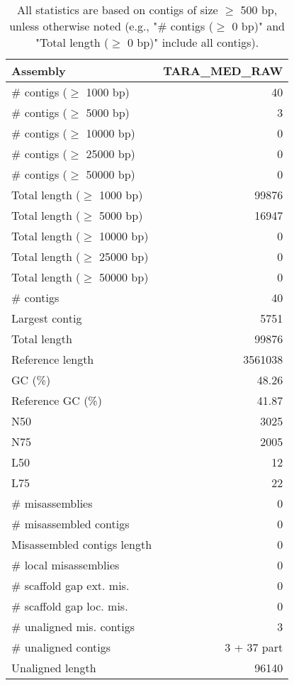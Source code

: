 \documentclass[12pt,a4paper]{article}
\begin{document}
\begin{table}[ht]
\begin{center}
\caption{All statistics are based on contigs of size $\geq$ 500 bp, unless otherwise noted (e.g., "\# contigs ($\geq$ 0 bp)" and "Total length ($\geq$ 0 bp)" include all contigs).}
\begin{tabular}{|l*{1}{|r}|}
\hline
Assembly & TARA\_MED\_RAW \\ \hline
\# contigs ($\geq$ 1000 bp) & 40 \\ \hline
\# contigs ($\geq$ 5000 bp) & 3 \\ \hline
\# contigs ($\geq$ 10000 bp) & 0 \\ \hline
\# contigs ($\geq$ 25000 bp) & 0 \\ \hline
\# contigs ($\geq$ 50000 bp) & 0 \\ \hline
Total length ($\geq$ 1000 bp) & 99876 \\ \hline
Total length ($\geq$ 5000 bp) & 16947 \\ \hline
Total length ($\geq$ 10000 bp) & 0 \\ \hline
Total length ($\geq$ 25000 bp) & 0 \\ \hline
Total length ($\geq$ 50000 bp) & 0 \\ \hline
\# contigs & 40 \\ \hline
Largest contig & 5751 \\ \hline
Total length & 99876 \\ \hline
Reference length & 3561038 \\ \hline
GC (\%) & 48.26 \\ \hline
Reference GC (\%) & 41.87 \\ \hline
N50 & 3025 \\ \hline
N75 & 2005 \\ \hline
L50 & 12 \\ \hline
L75 & 22 \\ \hline
\# misassemblies & 0 \\ \hline
\# misassembled contigs & 0 \\ \hline
Misassembled contigs length & 0 \\ \hline
\# local misassemblies & 0 \\ \hline
\# scaffold gap ext. mis. & 0 \\ \hline
\# scaffold gap loc. mis. & 0 \\ \hline
\# unaligned mis. contigs & 3 \\ \hline
\# unaligned contigs & 3 + 37 part \\ \hline
Unaligned length & 96140 \\ \hline

\end{tabular}
\end{center}
\end{table}
\end{document}
